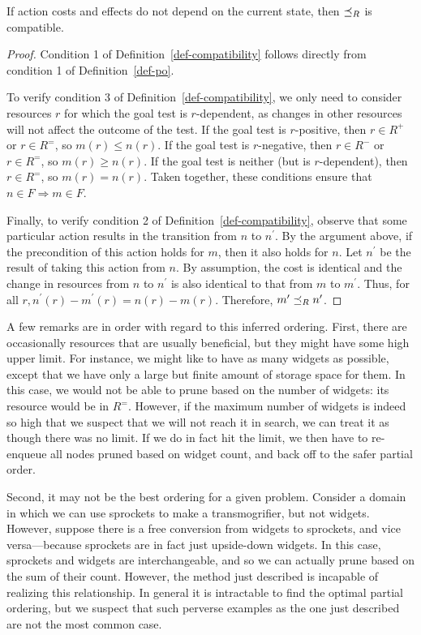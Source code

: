 \documentclass[letterpaper]{article}
\theoremstyle{plain} \newtheorem{theorem}{Theorem} \newtheorem{proposition}{Proposition} \newtheorem{lemma}{Lemma}
\theoremstyle{definition} \newtheorem{definition}{Definition} \newtheorem{conjecture}{Conjecture} \newtheorem*{example}{Example}
\theoremstyle{remark} \newtheorem*{remark}{Remark} \newtheorem*{note}{Note} \newtheorem{case}{Case}
\begin{document}
\begin{claim}{}{\label{clm-po-compatible}}
	If action costs and effects do not depend on the current state, then $\preceq_R$ is compatible.
\end{claim}
\begin{proof}
	Condition 1 of Definition~\ref{def-compatibility} follows directly from condition 1 of Definition~\ref{def-po}.
	
	To verify condition 3 of Definition~\ref{def-compatibility},
  we only need to consider resources $r$ for which the goal
  test is $r$-dependent, as changes in other resources will
  not affect the outcome of the test. If the goal test is
  $r$-positive, then $r \in R^+$ or $r \in R^=$, so $m(r) \le n(r)$. If the goal test is $r$-negative, then $r \in R^-$ or $r \in R^=$, so $m(r) \ge n(r)$. If the goal test is neither (but is $r$-dependent), then $r \in R^=$, so $m(r) = n(r)$. Taken together, these conditions ensure that $n \in F \Rightarrow m \in F$.
	
	Finally, to verify condition 2 of Definition~\ref{def-compatibility}, observe that some particular action results in the transition from $n$ to $n^\prime$. By the argument above, if the precondition of this action holds for $m$, then it also holds for $n$. Let
  $n^\prime$ be the result of taking this action from $n$. By
  assumption, the cost is identical and the change in resources
  from $n$ to $n^\prime$ is also identical to that from $m$ to
  $m^\prime$. Thus, for all $r, n^\prime(r) -
  m^\prime(r) = n(r) - m(r)$. Therefore, $m^\prime \preceq_R n^\prime$.
\end{proof}

A few remarks are in order with regard to this inferred ordering.
First, there are occasionally resources that are usually beneficial,
but they might have some high upper limit. For instance, we might
like to have as many widgets as possible, except that we have only
a large but finite amount of storage space for them.  In this case,
we would not be able to prune based on the number of widgets: its
resource would be in $R^=$. However, if the maximum number of widgets
is indeed so high that we suspect that we will not reach it in
search, we can treat it as though there was no limit. If we do in
fact hit the limit, we then have to re-enqueue all nodes pruned
based on widget count, and back off to the safer partial order.

Second, it may not be the best ordering for a given problem. Consider
a domain in which we can use sprockets to make a transmogrifier,
but not widgets. However, suppose there is a free conversion from
widgets to sprockets, and vice versa---because sprockets are in
fact just upside-down widgets. In this case, sprockets and widgets
are interchangeable, and so we can actually prune based on the sum
of their count. However, the method just described is incapable of
realizing this relationship. In general it is intractable to find
the optimal partial ordering, but we suspect that such perverse
examples as the one just described are not the most common case.
\end{document}
